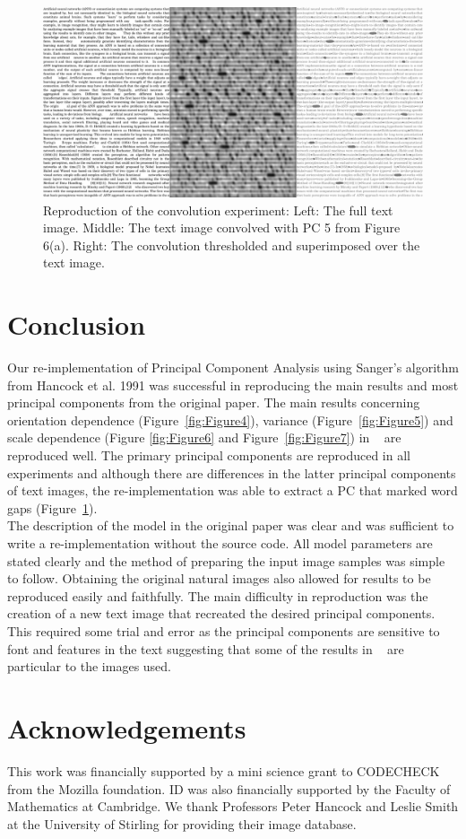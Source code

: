 \begin{figure}
    \centering
    \includegraphics[scale=0.15]{figures/julia-fig8.png}
    \caption{Reproduction of the convolution experiment: Left: The full text image. Middle: The text image convolved with PC 5 from Figure 6(a). Right: The convolution thresholded and superimposed over the text image.}
    \label{fig:Figure8}
\end{figure}

\section{Conclusion}
Our re-implementation of Principal Component Analysis using Sanger's algorithm from Hancock et al. 1991 was successful in reproducing the main results and most principal components from the original paper. The main results concerning orientation dependence (Figure~\ref{fig:Figure4}), variance (Figure~\ref{fig:Figure5}) and scale dependence (Figure \ref{fig:Figure6} and Figure~\ref{fig:Figure7}) in ~\cite{Hancock1992-mp} are reproduced well. The primary principal components are reproduced in all experiments and although there are differences in the latter principal components of text images, the re-implementation was able to extract a PC that marked word gaps (Figure~\ref{fig:Figure8}).\\
The description of the model in the original paper was clear and was sufficient to write a re-implementation without the source code. All model parameters are stated clearly and the method of preparing the input image samples was simple to follow. Obtaining the original natural images also allowed for results to be reproduced easily and faithfully. The main difficulty in reproduction was the creation of a new text image that recreated the desired principal components. This required some trial and error as the principal components are sensitive to font and features in the text suggesting that some of the results in ~\cite{Hancock1992-mp} are particular to the images used.

\section{Acknowledgements}
This work was financially supported by a mini science grant to CODECHECK
from the Mozilla foundation.  ID was also financially supported by the
Faculty of Mathematics at Cambridge.  We thank Professors Peter Hancock
and Leslie Smith at the University of Stirling for providing their
image database.
